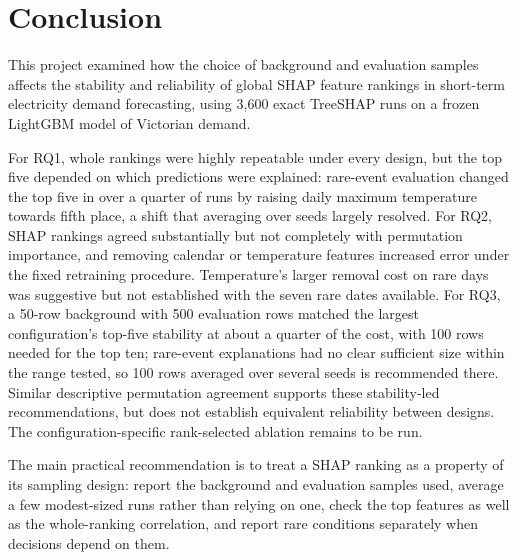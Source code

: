 \documentclass[11pt,a4paper]{article}
\begin{document}
\section{Conclusion}\label{sec:conclusion}

This project examined how the choice of background and evaluation samples affects the stability and reliability of global SHAP feature rankings in short-term electricity demand forecasting, using 3{,}600 exact TreeSHAP runs on a frozen LightGBM model of Victorian demand.

For RQ1, whole rankings were highly repeatable under every design, but the top five depended on which predictions were explained: rare-event evaluation changed the top five in over a quarter of runs by raising daily maximum temperature towards fifth place, a shift that averaging over seeds largely resolved. For RQ2, SHAP rankings agreed substantially but not completely with permutation importance, and removing calendar or temperature features increased error under the fixed retraining procedure. Temperature's larger removal cost on rare days was suggestive but not established with the seven rare dates available. For RQ3, a 50-row background with 500 evaluation rows matched the largest configuration's top-five stability at about a quarter of the cost, with 100 rows needed for the top ten; rare-event explanations had no clear sufficient size within the range tested, so 100 rows averaged over several seeds is recommended there. Similar descriptive permutation agreement supports these stability-led recommendations, but does not establish equivalent reliability between designs. The configuration-specific rank-selected ablation remains to be run.

The main practical recommendation is to treat a SHAP ranking as a property of its sampling design: report the background and evaluation samples used, average a few modest-sized runs rather than relying on one, check the top features as well as the whole-ranking correlation, and report rare conditions separately when decisions depend on them.



\end{document}
